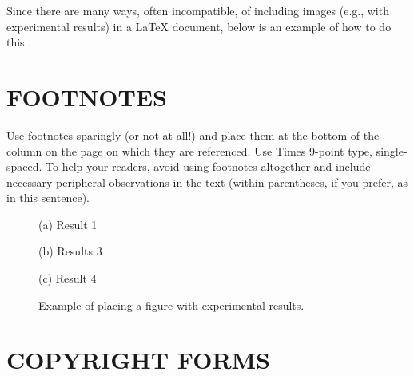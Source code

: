 \documentclass{article}
\begin{document}
Since there are many ways, often incompatible, of including images (e.g., with
experimental results) in a LaTeX document, below is an example of how to do
this \cite{Lamp86}.

\section{FOOTNOTES}
\label{sec:foot}

Use footnotes sparingly (or not at all!) and place them at the bottom of the
column on the page on which they are referenced. Use Times 9-point type,
single-spaced. To help your readers, avoid using footnotes altogether and
include necessary peripheral observations in the text (within parentheses, if
you prefer, as in this sentence).

\begin{figure}[htb]

\begin{minipage}[b]{1.0\linewidth}
  \centering
  \centerline{(a) Result 1}\medskip
\end{minipage}
%
\begin{minipage}[b]{.48\linewidth}
  \centering
  \centerline{(b) Results 3}\medskip
\end{minipage}
\hfill
\begin{minipage}[b]{0.48\linewidth}
  \centering
  \centerline{(c) Result 4}\medskip
\end{minipage}
%
\caption{Example of placing a figure with experimental results.}
\label{fig:res}
%
\end{figure}



\section{COPYRIGHT FORMS}
\label{sec:copyright}
\end{document}
